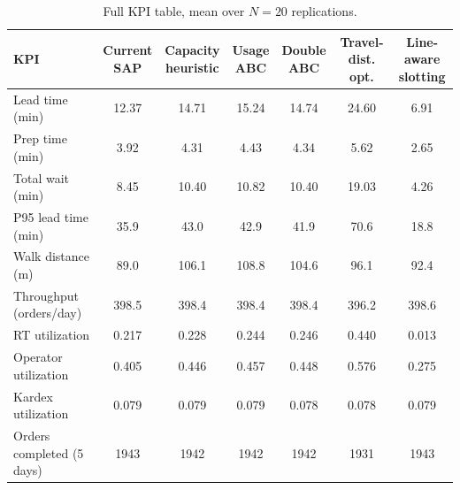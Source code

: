 \begin{table}[htbp]
\centering
\caption{Full KPI table, mean over $N=20$ replications.}
\label{tab:kpi_full}
\scriptsize
\setlength{\tabcolsep}{3pt}
\begin{tabular}{l*{6}{c}}
\toprule
KPI & \makecell{Current\\SAP} & \makecell{Capacity\\heuristic} & \makecell{Usage\\ABC} & \makecell{Double\\ABC} & \makecell{Travel-dist.\\opt.} & \makecell{Line-aware\\slotting} \\
\midrule
Lead time (min) & 12.37 & 14.71 & 15.24 & 14.74 & 24.60 & 6.91 \\
Prep time (min) & 3.92 & 4.31 & 4.43 & 4.34 & 5.62 & 2.65 \\
Total wait (min) & 8.45 & 10.40 & 10.82 & 10.40 & 19.03 & 4.26 \\
P95 lead time (min) & 35.9 & 43.0 & 42.9 & 41.9 & 70.6 & 18.8 \\
Walk distance (m) & 89.0 & 106.1 & 108.8 & 104.6 & 96.1 & 92.4 \\
Throughput (orders/day) & 398.5 & 398.4 & 398.4 & 398.4 & 396.2 & 398.6 \\
RT utilization & 0.217 & 0.228 & 0.244 & 0.246 & 0.440 & 0.013 \\
Operator utilization & 0.405 & 0.446 & 0.457 & 0.448 & 0.576 & 0.275 \\
Kardex utilization & 0.079 & 0.079 & 0.079 & 0.078 & 0.078 & 0.079 \\
Orders completed (5 days) & 1943 & 1942 & 1942 & 1942 & 1931 & 1943 \\
\bottomrule
\end{tabular}
\end{table}
